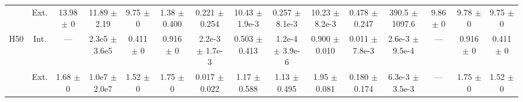 \begin{table}[htbp]
{\begin{tabular}{@{}ccccccccccccccc@{}}
 & Ext. & 13.98 $\pm$ 0 & 11.89 $\pm$ 2.19 & 9.75 $\pm$ 0 & 1.38 $\pm$ 0.400 & 0.221 $\pm$ 0.254 & 10.43 $\pm$ 1.9e-3 & 0.257 $\pm$ 8.1e-3 & 10.23 $\pm$ 8.2e-3 & 0.478 $\pm$ 0.247 & 390.5 $\pm$ 1097.6 & 9.86 $\pm$ 0 & 9.78 $\pm$ 0 & 9.75 $\pm$ 0 \\
\cline{2-15}
\multirow{2}{*}{H50} & Int. & --- & 2.3e5 $\pm$ 3.6e5 & 0.411 $\pm$ 0 & 0.916 $\pm$ 0 & 2.2e-3 $\pm$ 1.7e-3 & 0.503 $\pm$ 0.413 & 1.2e-4 $\pm$ 3.9e-6 & 0.900 $\pm$ 0.010 & 0.011 $\pm$ 7.8e-3 & 2.6e-3 $\pm$ 9.5e-4 & --- & 0.916 $\pm$ 0 & 0.411 $\pm$ 0 \\
 & Ext. & 1.68 $\pm$ 0 & 1.0e7 $\pm$ 2.0e7 & 1.52 $\pm$ 0 & 1.75 $\pm$ 0 & 0.017 $\pm$ 0.022 & 1.17 $\pm$ 0.588 & 1.13 $\pm$ 0.495 & 1.95 $\pm$ 0.081 & 0.180 $\pm$ 0.174 & 6.3e-3 $\pm$ 3.5e-3 & --- & 1.75 $\pm$ 0 & 1.52 $\pm$ 0 \\
\bottomrule
\end{tabular}
}
\end{table}